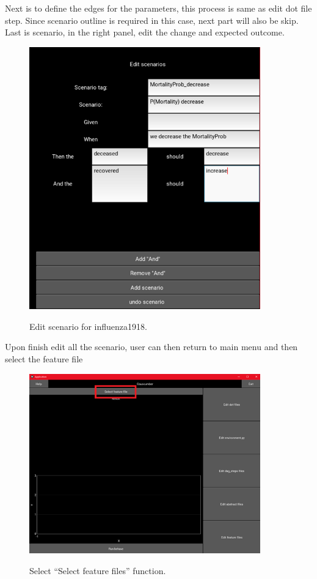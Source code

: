 Next is to define the edges for the parameters, this process is same as edit dot file step. Since scenario outline is required in this case, next part will also be skip. Last is scenario, in the right panel, edit the change and expected outcome. 
\begin{figure}[H]
	\centering
	\includegraphics[width=10cm]{figures/influenzaTestProcess12.png}\\
	\caption{Edit scenario for influenza1918.}
	\label{fig:figure30}
\end{figure}
Upon finish edit all the scenario, user can then return to main menu and then select the feature file
\begin{figure}[H]
	\centering
	\includegraphics[width=10cm]{figures/influenzaTestProcess13.png}\\
	\caption{Select “Select feature files” function.}
	\label{fig:figure31}
\end{figure}
